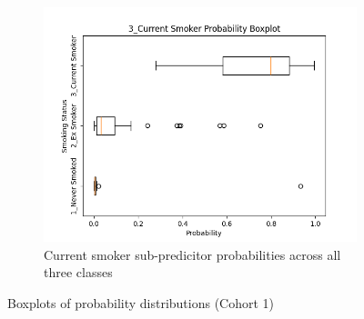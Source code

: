 \documentclass{article}
\begin{document}
\begin{figure}[H]
    \begin{subfigure}{0.48\textwidth}
        \centering
        \includegraphics[width=\linewidth]{cohort1_3_boxplot.png}
        \caption{Current smoker sub-predicitor probabilities across all three classes}
    \end{subfigure}
    \caption{Boxplots of probability distributions (Cohort 1)}
    \label{fig:boxplot-cohort1}
\end{figure}

\printbibliography
\end{document}
